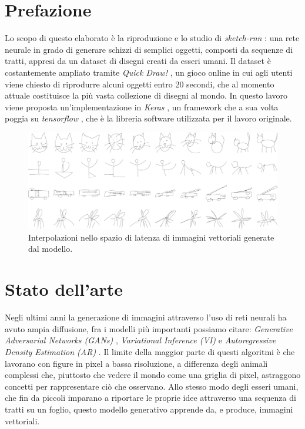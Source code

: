 \section{Prefazione}
Lo scopo di questo elaborato è la riproduzione e lo studio di \textit{sketch-rnn} \cite{sketchrnn}: una rete neurale in grado di generare schizzi di semplici oggetti, composti da sequenze di tratti, appresi da un dataset di disegni creati da esseri umani. Il dataset è costantemente ampliato tramite \textit{Quick Draw!} \cite{quickdraw}, un gioco online in cui agli utenti viene chiesto di riprodurre alcuni oggetti entro 20 secondi, che al momento attuale costituisce la più vasta collezione di disegni al mondo. In questo lavoro viene proposta un'implementazione in \textit{Keras} \cite{keras}, un framework che a sua volta poggia su \textit{tensorflow} \cite{tensorflow}, che è la libreria software utilizzata per il lavoro originale.
\begin{figure}[ht]
	\centering
	\includegraphics[width=\linewidth]{img/sketch_rnn_latent.png}
	\caption{Interpolazioni nello spazio di latenza di immagini vettoriali generate dal modello.}
	\label{fig:1.1}
\end{figure}
\section{Stato dell'arte}
Negli ultimi anni la generazione di immagini attraverso l'uso di reti neurali ha avuto ampia diffusione, fra i modelli più importanti possiamo citare: \textit{Generative Adversarial Networks (GANs)} \cite{GAN}, \textit{Variational Inference (VI)} \cite{VI} e \textit{Autoregressive Density Estimation (AR)} \cite{AR}. Il limite della maggior parte di questi algoritmi è che lavorano con figure in pixel a bassa risoluzione, a differenza degli animali complessi che, piuttosto che vedere il mondo come una griglia di pixel, astraggono concetti per rappresentare ciò che osservano. Allo stesso modo degli esseri umani, che fin da piccoli imparano a riportare le proprie idee attraverso una sequenza di tratti su un foglio, questo modello generativo apprende da, e produce, immagini vettoriali.

